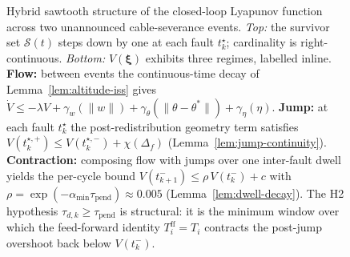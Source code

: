 \begin{figure}[t]
\caption{Hybrid sawtooth structure of the closed-loop Lyapunov
function across two unannounced cable-severance events.
\emph{Top:} the survivor set $\mathcal{S}(t)$ steps down by one
at each fault $t_k^\star$; cardinality is right-continuous.
\emph{Bottom:} $V(\boldsymbol{\xi})$ exhibits three regimes,
labelled inline. \textbf{Flow:} between events the continuous-time
decay of Lemma~\ref{lem:altitude-iss} gives
$\dot V \le -\lambda V + \gamma_w(\|w\|) +
\gamma_\theta(\|\theta-\theta^\ast\|) + \gamma_\eta(\eta)$.
\textbf{Jump:} at each fault $t_k^\star$ the post-redistribution
geometry term satisfies
$V(t_k^{\star,+}) \le V(t_k^{\star,-}) + \chi(\Delta_f)$
(Lemma~\ref{lem:jump-continuity}). \textbf{Contraction:} composing
flow with jumps over one inter-fault dwell yields the
per-cycle bound
$V(t_{k+1}^-) \le \rho\,V(t_k^-) + c$ with
$\rho = \exp(-\alpha_{\min}\tau_{\mathrm{pend}}) \approx 0.005$
(Lemma~\ref{lem:dwell-decay}). The H2 hypothesis
$\tau_{d,k} \ge \tau_{\mathrm{pend}}$ is structural: it is the
minimum window over which the feed-forward identity
$T_i^{\mathrm{ff}} = T_i$ contracts the post-jump overshoot
back below $V(t_k^-)$.}
\label{fig:lyapunov-sawtooth}
\end{figure}
